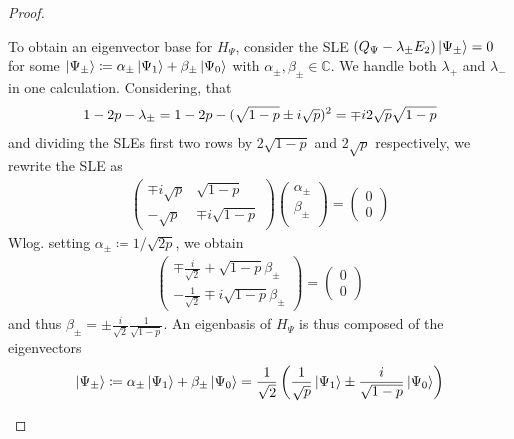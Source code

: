 \begin{proof}
\begin{enumerate}[label=(\roman*)]
        To obtain an eigenvector base for \(H_\Psi\), consider the SLE \((Q_\Psi - \lambda_\pm E_2)\ket{\Psi_\pm} = 0\) for some \(\ket{\Psi_\pm} \coloneqq \alpha_\pm \ket{\Psi_1} + \beta_\pm \ket{\Psi_0}\) with \(\alpha_\pm, \beta_\pm \in \mathbb{C}\). We handle both \(\lambda_+\) and \(\lambda_-\) in one calculation. Considering, that
        \begin{align}
            1-2p-\lambda_\pm = 1-2p-(\sqrt{1-p} \pm i\sqrt{p})^2 = \mp i 2 \sqrt{p}\sqrt{1-p} \label{expanded_lpm_appearing}
        \end{align}
        and dividing the SLEs first two rows by \(2\sqrt{1-p}\) and \(2\sqrt{p}\) respectively, we rewrite the SLE as
        \begin{align}
            \begin{pmatrix}
                \mp i\sqrt{p} & \sqrt{1-p}\\
                -\sqrt{p} & \mp i \sqrt{1-p}
            \end{pmatrix} \begin{pmatrix}
                \alpha_\pm\\
                \beta_\pm\\
            \end{pmatrix} = \begin{pmatrix}
                0\\
                0
            \end{pmatrix}
        \end{align}
        Wlog. setting \(\alpha_\pm \coloneqq 1/\sqrt{2p}\), we obtain
        \begin{align}
            \begin{pmatrix}
                \mp \frac{i}{\sqrt{2}}+\sqrt{1-p}\beta_\pm\\
                -\frac{1}{\sqrt{2}} \mp i\sqrt{1-p}\beta_\pm
            \end{pmatrix} = \begin{pmatrix}
                0\\
                0
            \end{pmatrix}
        \end{align}
        and thus \(\beta_\pm = \pm \frac{i}{\sqrt{2}}\frac{1}{\sqrt{1-p}}\). An eigenbasis of \(H_\Psi\) is thus composed of the eigenvectors
        \begin{align}
            \ket{\Psi_\pm} \coloneqq \alpha_\pm\ket{\Psi_1} + \beta_\pm\ket{\Psi_0} = \frac{1}{\sqrt{2}} \left(\frac{1}{\sqrt{p}}\ket{\Psi_1} \pm \frac{i}{\sqrt{1-p}}\ket{\Psi_0} \right)

\end{align}
\end{enumerate}
\end{proof}
